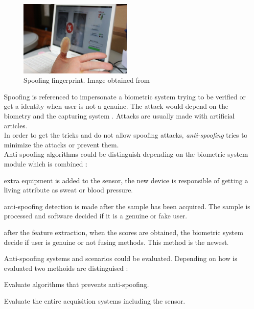 \begin{figure}[htb]
\centering
\includegraphics[width=0.5\textwidth]{images_miscelaneus/spoofing_fingerprint.jpg}
\caption{Spoofing fingerprint. Image obtained from \cite{fingerprint_image}} \label{fig:Spoof_fingerprint}
\end{figure}

Spoofing is referenced to impersonate a biometric system trying to be verified or get a identity when user is not a genuine. The attack would depend on the biometry and the capturing system \cite{Spoofing_survey}. Attacks are usually made with artificial articles.\\

In order to get the tricks and do not allow spoofing attacks, \textit{anti-spoofing} tries to minimize the attacks or prevent them.\\

Anti-spoofing algorithms could be distinguish depending on the biometric system module which is combined \cite{Spoofing_survey}:
\begin{description}[noitemsep,topsep=8pt,parsep=0pt,partopsep=20pt]
\item[Sensor level:] extra equipment is added to the sensor, the new device is responsible of getting a living attribute as sweat or blood pressure. 
\item[Feature level:] anti-spoofing detection is made after the sample has been acquired. The sample is processed and software decided if it is a genuine or fake user.
\item[Score level:] after the feature extraction, when the scores are obtained, the biometric system decide if user is genuine or not fusing methods. This method is the newest.
\end{description}


Anti-spoofing systems and scenarios could be evaluated. Depending on how is evaluated two methoids are distinguised \cite{Spoofing_survey}:
\begin{description}[noitemsep,topsep=8pt,parsep=0pt,partopsep=20pt]
\item[Algorithm-based or technology evaluation:] Evaluate algorithms that prevents anti-spoofing.
\item[System-based or scenario evaluation:] Evaluate the entire acquisition systems including the sensor.
\end{description}

